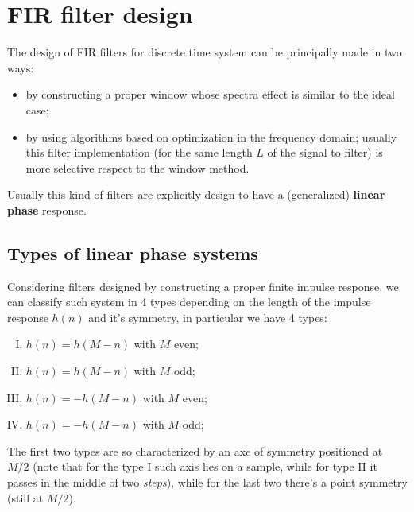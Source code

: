 \section{FIR filter design}
	The design of  FIR filters for discrete time system can be principally made in two ways:
	\begin{itemize}
		\item by constructing a proper window whose spectra effect is similar to the ideal case;
		\item by using algorithms based on optimization in the frequency domain; usually this filter implementation (for the same length $L$ of the signal to filter) is more selective respect to the window method.
	\end{itemize}
	Usually this kind of filters are explicitly design to have a (generalized) \textbf{linear phase} response.

	\subsection{Types of linear phase systems}
		Considering filters designed by constructing a proper finite impulse response, we can classify such system in 4 types depending on the length of the impulse response $h(n)$ and it's symmetry, in particular we have 4 types:
		\begin{enumerate}[I)]
			\item $h(n) = h(M-n)$ with $M$ even;
			\item $h(n) = h(M-n)$ with $M$ odd;
			\item $h(n) = - h(M-n)$ with $M$ even;
			\item $h(n) = - h(M-n)$ with $M$ odd;
		\end{enumerate}
		The first two types are so characterized by an axe of symmetry positioned at $M/2$ (note that for the type I such axis lies on a sample, while for type II it passes in the middle of two \textit{steps}), while for the last two there's a point symmetry (still at $M/2$).
		
